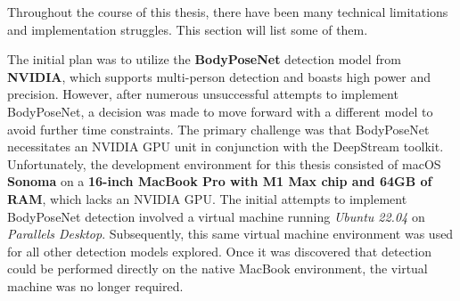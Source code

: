 

Throughout the course of this thesis, there have been many technical limitations and implementation struggles. This section will list some of them.

The initial plan was to utilize the {\bf BodyPoseNet} detection model from {\bf NVIDIA}, which supports multi-person detection and boasts high power and precision. However, after numerous unsuccessful attempts to implement BodyPoseNet, a decision was made to move forward with a different model to avoid further time constraints. The primary challenge was that BodyPoseNet necessitates an NVIDIA GPU unit in conjunction with the DeepStream toolkit. Unfortunately, the development environment for this thesis consisted of macOS {\bf Sonoma} on a {\bf 16-inch MacBook Pro with M1 Max chip and 64GB of RAM}, which lacks an NVIDIA GPU. The initial attempts to implement BodyPoseNet detection involved a virtual machine running {\em Ubuntu 22.04} on {\em Parallels Desktop}. Subsequently, this same virtual machine environment was used for all other detection models explored. Once it was discovered that detection could be performed directly on the native MacBook environment, the virtual machine was no longer required.